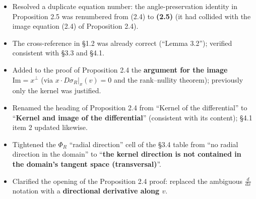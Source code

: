\documentclass[
]{ltjsarticle}
\providecommand{\tightlist}{%
  \setlength{\itemsep}{0pt}\setlength{\parskip}{0pt}}
\begin{document}
\begin{itemize}
  \begin{itemize}
  \tightlist
  \item
    Resolved a duplicate equation number: the angle-preservation
    identity in Proposition 2.5 was renumbered from (2.4) to
    \textbf{(2.5)} (it had collided with the image equation (2.4) of
    Proposition 2.4).
  \item
    The cross-reference in §1.2 was already correct (``Lemma 3.2'');
    verified consistent with §3.3 and §4.1.
  \item
    Added to the proof of Proposition 2.4 the \textbf{argument for the
    image \(\mathrm{Im} = x^\perp\)} (via
    \(x \cdot D\sigma_R|_x(v) = 0\) and the rank--nullity theorem);
    previously only the kernel was justified.
  \item
    Renamed the heading of Proposition 2.4 from ``Kernel of the
    differential'' to ``\textbf{Kernel and image of the differential}''
    (consistent with its content); §4.1 item 2 updated likewise.
  \item
    Tightened the \(\Phi_R\) ``radial direction'' cell of the §3.4 table
    from ``no radial direction in the domain'' to ``\textbf{the kernel
    direction is not contained in the domain's tangent space
    (transversal)}''.
  \item
    Clarified the opening of the Proposition 2.4 proof: replaced the
    ambiguous \(\frac{d}{dx}\) notation with a \textbf{directional
    derivative along \(v\)}.
  \end{itemize}
\end{itemize}
\end{document}
